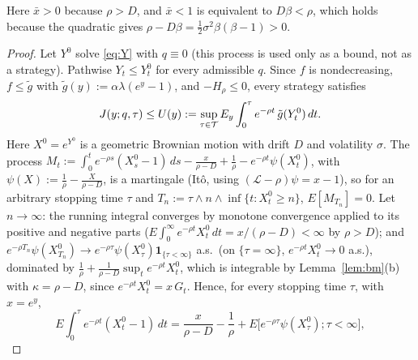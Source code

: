 \noindent Here $\bar x>0$ because $\rho>D$, and $\bar x<1$ is equivalent to $D\beta<\rho$, which holds because the quadratic gives $\rho-D\beta=\tfrac12\sigma^2\beta(\beta-1)>0$.

\begin{proof}
Let $Y^0$ solve \eqref{eq:Y} with $q\equiv0$ (this process is used only as a bound, not as a strategy). Pathwise $Y_t\le Y^0_t$ for every admissible $q$. Since $f$ is nondecreasing, $f\le\tilde g$ with $\tilde g(y):=\alpha\lambda(e^y-1)$, and $-H_\rho\le0$, every strategy satisfies
\[
J(y;q,\tau)\le U(y):=\sup_{\tau\in\mathcal{T}}E_y\int_0^\tau e^{-\rho t}\,\tilde g(Y^0_t)\,dt .
\]
Here $X^0=e^{Y^0}$ is a geometric Brownian motion with drift $D$ and volatility $\sigma$. The process $M_t:=\int_0^t e^{-\rho s}(X^0_s-1)\,ds-\frac{x}{\rho-D}+\frac1\rho-e^{-\rho t}\psi(X^0_t)$, with $\psi(X):=\frac1\rho-\frac{X}{\rho-D}$, is a martingale (It\^o, using $(\mathcal L-\rho)\psi=x-1$), so for an arbitrary stopping time $\tau$ and $T_n:=\tau\wedge n\wedge\inf\{t:X^0_t\ge n\}$, $E[M_{T_n}]=0$. Let $n\to\infty$: the running integral converges by monotone convergence applied to its positive and negative parts ($E\int_0^\infty e^{-\rho t}X^0_t\,dt=x/(\rho-D)<\infty$ by $\rho>D$); and $e^{-\rho T_n}\psi(X^0_{T_n})\to e^{-\rho\tau}\psi(X^0_\tau)\mathbf 1_{\{\tau<\infty\}}$ a.s.\ (on $\{\tau=\infty\}$, $e^{-\rho t}X^0_t\to0$ a.s.), dominated by $\frac1\rho+\frac{1}{\rho-D}\sup_t e^{-\rho t}X^0_t$, which is integrable by Lemma~\ref{lem:bm}(b) with $\kappa=\rho-D$, since $e^{-\rho t}X^0_t=x\,G_t$. Hence, for every stopping time $\tau$, with $x=e^y$,
\[
E\int_0^\tau e^{-\rho t}(X^0_t-1)\,dt=\frac{x}{\rho-D}-\frac1\rho+E\big[e^{-\rho\tau}\psi(X^0_\tau);\tau<\infty\big],
\]

\end{proof}
